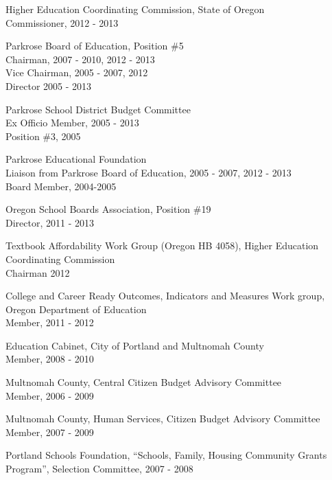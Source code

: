 \documentclass[Computer Science]{vita}
\begin{document}
\begin{vita}
\begin{Professional and Service Activities}
\begin{Community}
\item Higher Education Coordinating Commission, State of Oregon\\
Commissioner, 2012 - 2013

    \item Parkrose Board of Education, Position \#5\\
      Chairman, 2007 - 2010, 2012 - 2013\\
      Vice Chairman, 2005 - 2007, 2012 \\
      Director 2005 - 2013

    \item Parkrose School District Budget Committee\\
      Ex Officio Member, 2005 - 2013\\
      Position \#3, 2005

\item Parkrose Educational Foundation\\
      Liaison from Parkrose Board of Education, 2005 - 2007, 2012 - 2013\\
      Board Member, 2004-2005


    \item Oregon School Boards Association, Position \#19\\
    Director, 2011 - 2013

  \item Textbook Affordability Work Group (Oregon HB 4058), Higher Education Coordinating Commission\\ Chairman 2012

\item College and Career Ready Outcomes, Indicators and Measures Work group, Oregon Department of Education\\
Member, 2011 -  2012

    \item  Education Cabinet, City of Portland and Multnomah County\\
      Member, 2008 - 2010

    \item Multnomah County, Central Citizen Budget Advisory Committee\\
      Member, 2006 - 2009

    \item Multnomah County, Human Services, Citizen Budget Advisory
      Committee\\Member, 2007 - 2009

    \item Portland Schools Foundation, ``Schools, Family, Housing
      Community Grants Program'', Selection Committee, 2007 - 2008


\end{Community}
\end{Professional and Service Activities}
\end{vita}
\end{document}

